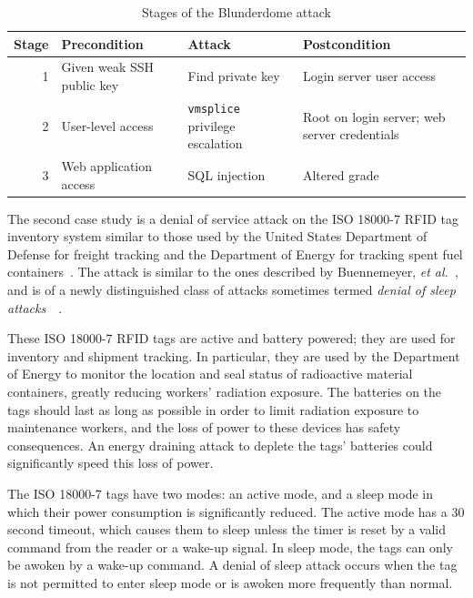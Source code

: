 \begin{table}
\centering
\begin{tabular}{r|p{1.25in}|p{1.35in}|p{1.75in}}
Stage & Precondition	&	Attack	&	Postcondition \\ \hline \hline
1 & \raggedright Given weak SSH public key
	& \raggedright Find private key &  Login server user access \\ \hline
2 & \raggedright User-level access & \raggedright \texttt{vmsplice} privilege escalation 
	& Root on login server; web server credentials \\ \hline
3 & \raggedright Web application access & \raggedright SQL injection & Altered grade
\end{tabular}
\caption{Stages of the Blunderdome attack}
\label{table:blundertasks}
\end{table}
\label{sec:bg:rfid}
The second case study is a denial of service attack
on the ISO 18000-7 RFID tag inventory system similar to those used by the United States
Department of Defense for freight tracking and the Department of Energy for tracking spent
fuel containers~\cite{chen2009radiofrequency}. The attack
is similar to the ones described by Buennemeyer, \emph{et al.}~\cite{buennemeyer2006battery},
and is of a newly distinguished class of attacks sometimes termed \emph{denial
of sleep attacks}~\cite{brownfield2005wireless}~\cite{raymond2009effects}.

These ISO 18000-7 RFID tags are active and battery powered; they are used for inventory and
shipment tracking. In particular, they are used by the Department of Energy to monitor
the location and seal status of
radioactive material containers, greatly reducing workers' radiation exposure. 
The batteries on the tags should last as long as
possible in order to limit radiation exposure to maintenance workers, and
the loss of power to these devices has safety consequences.
An energy draining attack to deplete the tags' batteries could significantly
speed this loss of power.

The ISO 18000-7 tags have two modes: an active mode, and a sleep mode in which their
power consumption is significantly reduced. The active mode has a 30 second timeout,
which causes them to sleep unless the timer is reset by a valid
command from the reader or a wake-up signal. In sleep mode, the tags can only
be awoken by a wake-up command.
A denial of sleep attack occurs when the tag is not permitted to enter sleep mode or is
awoken more frequently than normal.

